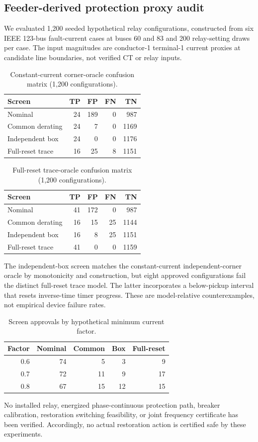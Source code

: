 \subsection{Feeder-derived protection proxy audit}\label{sec:p9-proxy}
We evaluated 1,200 seeded hypothetical relay configurations, constructed from six IEEE 123-bus fault-current cases at buses 60 and 83 and 200 relay-setting draws per case. The input magnitudes are conductor-1 terminal-1 current proxies at candidate line boundaries, not verified CT or relay inputs.
\begin{table}[H]\centering\caption{Constant-current corner-oracle confusion matrix (1,200 configurations).}\label{tab:p9-corners}
\begin{tabular}{lrrrr}\toprule
Screen & TP & FP & FN & TN\\\midrule
Nominal & 24 & 189 & 0 & 987\\
Common derating & 24 & 7 & 0 & 1169\\
Independent box & 24 & 0 & 0 & 1176\\
Full-reset trace & 16 & 25 & 8 & 1151\\\bottomrule
\end{tabular}\end{table}
\begin{table}[H]\centering\caption{Full-reset trace-oracle confusion matrix (1,200 configurations).}\label{tab:p9-traces}
\begin{tabular}{lrrrr}\toprule
Screen & TP & FP & FN & TN\\\midrule
Nominal & 41 & 172 & 0 & 987\\
Common derating & 16 & 15 & 25 & 1144\\
Independent box & 16 & 8 & 25 & 1151\\
Full-reset trace & 41 & 0 & 0 & 1159\\\bottomrule
\end{tabular}\end{table}
The independent-box screen matches the constant-current independent-corner oracle by monotonicity and construction, but eight approved configurations fail the distinct full-reset trace model. The latter incorporates a below-pickup interval that resets inverse-time timer progress. These are model-relative counterexamples, not empirical device failure rates.
\begin{table}[H]\centering\caption{Screen approvals by hypothetical minimum current factor.}\label{tab:p9-sensitivity}
\begin{tabular}{rrrrr}\toprule
Factor & Nominal & Common & Box & Full-reset\\\midrule
0.6 & 74 & 5 & 3 & 9\\
0.7 & 72 & 11 & 9 & 17\\
0.8 & 67 & 15 & 12 & 15\\\bottomrule
\end{tabular}\end{table}
No installed relay, energized phase-continuous protection path, breaker calibration, restoration switching feasibility, or joint frequency certificate has been verified. Accordingly, no actual restoration action is certified safe by these experiments.
